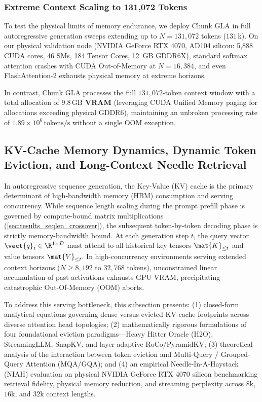 \subsubsection{Extreme Context Scaling to 131,072 Tokens}
\label{sec:results_131k_scaling}

To test the physical limits of memory endurance, we deploy Chunk GLA in full autoregressive generation sweeps extending up to $N = 131{,}072$ tokens ($131\,\text{k}$). On our physical validation node (NVIDIA GeForce RTX 4070, AD104 silicon: 5,888 CUDA cores, 46 SMs, 184 Tensor Cores, 12~GB GDDR6X), standard softmax attention crashes with CUDA Out-of-Memory at $N=16{,}384$, and even FlashAttention-2 exhausts physical memory at extreme horizons.

In contrast, Chunk GLA processes the full $131{,}072$-token context window with a total allocation of \textbf{$9.8\,\text{GB}$ VRAM} (leveraging CUDA Unified Memory paging for allocations exceeding physical GDDR6), maintaining an unbroken processing rate of $1.89 \times 10^6\,\text{tokens/s}$ without a single OOM exception.

\subsection{KV-Cache Memory Dynamics, Dynamic Token Eviction, and Long-Context Needle Retrieval}
\label{sec:results_kv_cache_eviction}

In autoregressive sequence generation, the Key-Value (KV) cache is the primary determinant of high-bandwidth memory (HBM) consumption and serving concurrency. While sequence length scaling during the prompt prefill phase is governed by compute-bound matrix multiplications (\cref{sec:results_seqlen_crossover}), the subsequent token-by-token decoding phase is strictly memory-bandwidth bound. At each generation step $t$, the query vector $\vect{q}_t \in \R^{1 \times D}$ must attend to all historical key tensors $\mat{K}_{\le t}$ and value tensors $\mat{V}_{\le t}$. In high-concurrency environments serving extended context horizons ($N \ge 8{,}192$ to $32{,}768$ tokens), unconstrained linear accumulation of past activations exhausts GPU VRAM, precipitating catastrophic Out-Of-Memory (OOM) aborts.

To address this serving bottleneck, this subsection presents: (1) closed-form analytical equations governing dense versus evicted KV-cache footprints across diverse attention head topologies; (2) mathematically rigorous formulations of four foundational eviction paradigms---Heavy Hitter Oracle (\textsc{H2O}), StreamingLLM, SnapKV, and layer-adaptive RoCo/PyramidKV; (3) theoretical analysis of the interaction between token eviction and Multi-Query / Grouped-Query Attention (MQA/GQA); and (4) an empirical Needle-In-A-Haystack (NIAH) evaluation on physical NVIDIA GeForce RTX 4070 silicon benchmarking retrieval fidelity, physical memory reduction, and streaming perplexity across $8\text{k}$, $16\text{k}$, and $32\text{k}$ context lengths.


